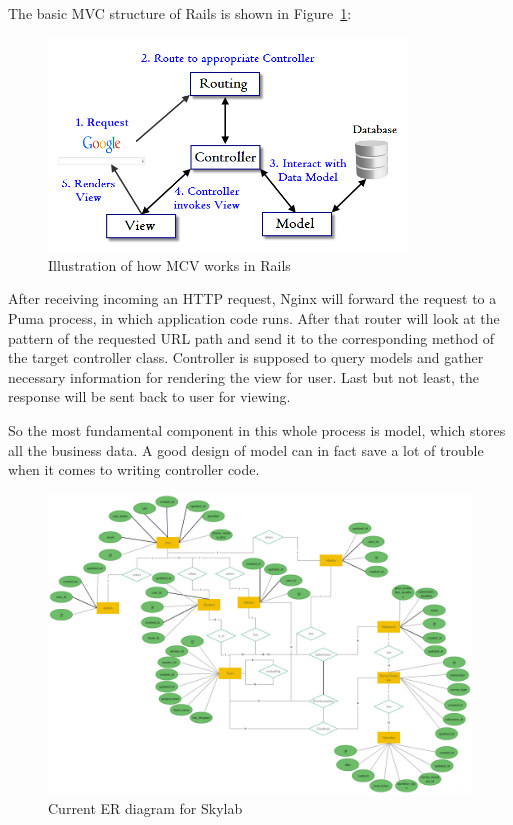The basic MVC structure of Rails is shown in Figure~\ref{fig:RailsMVC}\cite{citationMVC}:

\begin{figure}[h]
  \centering
  \includegraphics[width=0.85\textwidth]{Images/Rails_MVC.png}
  \caption{Illustration of how MCV works in Rails}
  \label{fig:RailsMVC}
\end{figure}

After receiving incoming an HTTP request, Nginx will forward the request to a Puma process, in which application code runs. After that router will look at the pattern of the requested URL path and send it to the corresponding method of the target controller class. Controller is supposed to query models and gather necessary information for rendering the view for user. Last but not least, the response will be sent back to user for viewing.

So the most fundamental component in this whole process is model, which stores all the business data. A good design of model can in fact save a lot of trouble when it comes to writing controller code.

\begin{figure}[h]
  \centering
  \includegraphics[width=\textwidth]{Images/Skylab_ER.png}
  \caption{Current ER diagram for Skylab}
  \label{fig:SkylabER}
\end{figure}

